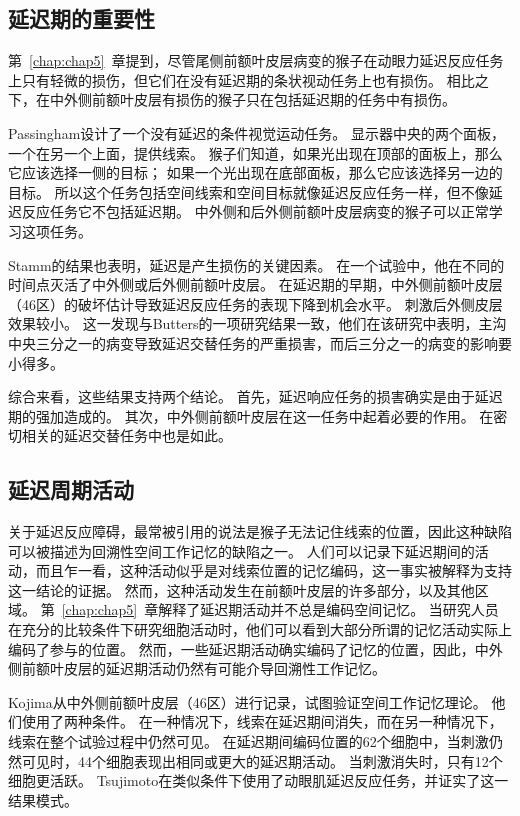 \subsection{延迟期的重要性}

第~\ref{chap:chap5}~章提到，尽管尾侧前额叶皮层病变的猴子在动眼力延迟反应任务上只有轻微的损伤，但它们在没有延迟期的条状视动任务上也有损伤。
相比之下，在中外侧前额叶皮层有损伤的猴子只在包括延迟期的任务中有损伤。


Passingham\cite{passingham1985memory}设计了一个没有延迟的条件视觉运动任务。
显示器中央的两个面板，一个在另一个上面，提供线索。
猴子们知道，如果光出现在顶部的面板上，那么它应该选择一侧的目标；
如果一个光出现在底部面板，那么它应该选择另一边的目标。
所以这个任务包括空间线索和空间目标就像延迟反应任务一样，但不像延迟反应任务它不包括延迟期。
中外侧和后外侧前额叶皮层病变的猴子可以正常学习这项任务。


Stamm\cite{stamm1969electrical}的结果也表明，延迟是产生损伤的关键因素。
在一个试验中，他在不同的时间点灭活了中外侧或后外侧前额叶皮层。
在延迟期的早期，中外侧前额叶皮层（46区）的破坏估计导致延迟反应任务的表现下降到机会水平。
刺激后外侧皮层效果较小。
这一发现与Butters\cite{butters1969retention}的一项研究结果一致，他们在该研究中表明，主沟中央三分之一的病变导致延迟交替任务的严重损害，而后三分之一的病变的影响要小得多。


综合来看，这些结果支持两个结论。
首先，延迟响应任务的损害确实是由于延迟期的强加造成的。
其次，中外侧前额叶皮层在这一任务中起着必要的作用。
在密切相关的延迟交替任务中也是如此。



\subsection{延迟周期活动}

关于延迟反应障碍，最常被引用的说法是猴子无法记住线索的位置，因此这种缺陷可以被描述为回溯性空间工作记忆的缺陷之一。
人们可以记录下延迟期间的活动，而且乍一看，这种活动似乎是对线索位置的记忆编码，这一事实被解释为支持这一结论的证据。
然而，这种活动发生在前额叶皮层的许多部分，以及其他区域。
第~\ref{chap:chap5}~章解释了延迟期活动并不总是编码空间记忆。
当研究人员在充分的比较条件下研究细胞活动时，他们可以看到大部分所谓的记忆活动实际上编码了参与的位置。
然而，一些延迟期活动确实编码了记忆的位置，因此，中外侧前额叶皮层的延迟期活动仍然有可能介导回溯性工作记忆。


Kojima\cite{kojima1984functional}从中外侧前额叶皮层（46区）进行记录，试图验证空间工作记忆理论。
他们使用了两种条件。
在一种情况下，线索在延迟期间消失，而在另一种情况下，线索在整个试验过程中仍然可见。
在延迟期间编码位置的62个细胞中，当刺激仍然可见时，44个细胞表现出相同或更大的延迟期活动。
当刺激消失时，只有12个细胞更活跃。
Tsujimoto\cite{tsujimoto2004properties}在类似条件下使用了动眼肌延迟反应任务，并证实了这一结果模式。


